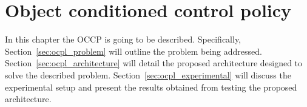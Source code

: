 \chapter{Object conditioned control policy}
In this chapter the OCCP is going to be described. Specifically, Section~\ref{sec:ocpl_problem} will outline the problem being addressed. Section~\ref{sec:ocpl_architecture} will detail the proposed architecture designed to solve the described problem. Section~\ref{sec:ocpl_experimental} will discuss the experimental setup and present the results obtained from testing the proposed architecture.



